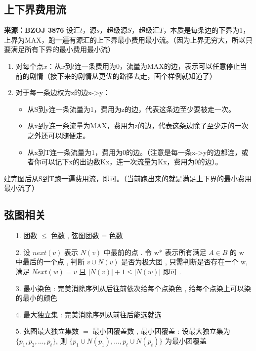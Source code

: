 \documentclass[a4paper]{article}
\begin{document}
\subsection{上下界费用流}
\noindent \textbf{来源：BZOJ 3876}
\noindent 设汇$t$，源$s$，超级源$S$，超级汇$T$，本质是每条边的下界为1，上界为MAX，跑一遍有源汇的上下界最小费用最小流。（因为上界无穷大，所以只要满足所有下界的最小费用最小流）

\begin{enumerate}
	\item 对每个点$x$：从$x$到$t$连一条费用为0，流量为MAX的边，表示可以任意停止当前的剧情（接下来的剧情从更优的路径去走，画个样例就知道了）
	\item 对于每一条边权为z的边x->y：
	
	\begin{itemize}
		\item 从S到y连一条流量为1，费用为z的边，代表这条边至少要被走一次。
		\item 从x到y连一条流量为MAX，费用为z的边，代表这条边除了至少走的一次之外还可以随便走。
		\item 从x到T连一条流量为1，费用为0的边。（注意是每一条x->y的边都连，或者你可以记下x的出边数Kx，连一次流量为Kx，费用为0的边）。
		
	\end{itemize}
\end{enumerate}
建完图后从S到T跑一遍费用流，即可。（当前跑出来的就是满足上下界的最小费用最小流了）

\subsection{弦图相关}
\begin{enumerate}
	\item[1.] 团数 $\leq$ 色数 , 弦图团数 = 色数
	\item[2.] 设 $next(v)$ 表示 $N(v)$ 中最前的点 . 
	令 w* 表示所有满足 $A \in B$ 的 w 中最后的一个点 , 
	判断 $v \cup N(v)$ 是否为极大团 , 
	只需判断是否存在一个 w, 
	满足 $Next(w)=v$ 且 $|N(v)| + 1 \leq |N(w)|$ 即可 . 
	\item[3.] 最小染色 : 完美消除序列从后往前依次给每个点染色 , 
	给每个点染上可以染的最小的颜色
	\item[4.] 最大独立集 : 完美消除序列从前往后能选就选
	\item[5.] 弦图最大独立集数 $=$ 最小团覆盖数 , 
	最小团覆盖 : 
	设最大独立集为 $\{p_1,p_2, \dots ,p_t\}$, 
	则 $\{p_1\cup N(p_1), \dots , p_t \cup N(p_t)\}$ 
	为最小团覆盖
\end{enumerate}
\end{document}

